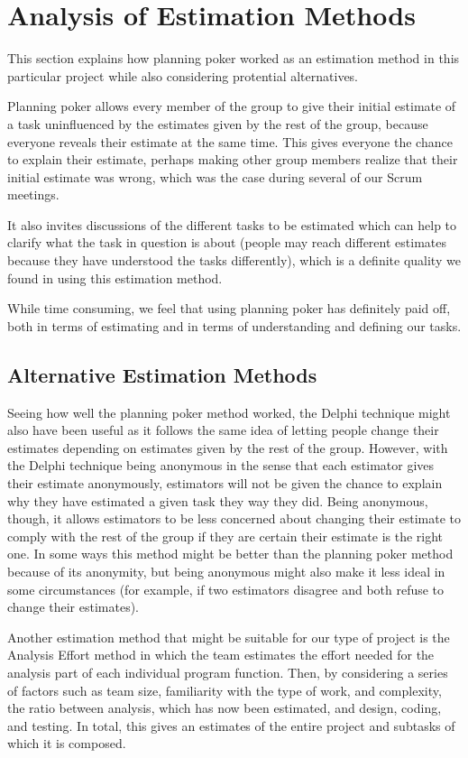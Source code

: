 \section{Analysis of Estimation Methods}
\label{sec:AnalysisEstimation}
This section explains how planning poker worked as an estimation method in this
particular project while also considering protential alternatives.

Planning poker allows every member of the group to give their initial estimate
of a task uninfluenced by the estimates given by the rest of the group, because
everyone reveals their estimate at the same time. This gives everyone the chance
to explain their estimate, perhaps making other group members realize that their
initial estimate was wrong, which was the case during several of our Scrum
meetings.

It also invites discussions of the different tasks to be estimated which can help
to clarify what the task in question is about (people may reach different estimates
because they have understood the tasks differently), which is a definite quality we
found in using this estimation method.

While time consuming, we feel that using planning poker has definitely paid off,
both in terms of estimating and in terms of understanding and defining our tasks.

\subsection{Alternative Estimation Methods}
Seeing how well the planning poker method worked, the Delphi technique\cite{caye} might also have been useful as it follows the same idea of letting people change their estimates depending on estimates given by the rest of the group. However, with the Delphi technique being anonymous in the sense that each estimator gives their estimate anonymously, estimators will not be given the chance to explain why they have estimated a given task they way they did. Being anonymous, though, it allows estimators to be less concerned about changing their estimate to comply with the rest of the group if they are certain their estimate is the right one. In some ways this method might be better than the planning poker method because of its anonymity, but being anonymous might also make it less ideal in some circumstances (for example, if two estimators disagree and both refuse to change their estimates).

Another estimation method that might be suitable for our type of project is the Analysis Effort method\cite{caye} in which the team estimates the effort needed for the analysis part of each individual program function. Then, by considering a series of factors such as team size, familiarity with the type of work, and complexity, the ratio between analysis, which has now been estimated, and design, coding, and testing. In total, this gives an estimates of the entire project and subtasks of which it is composed.

